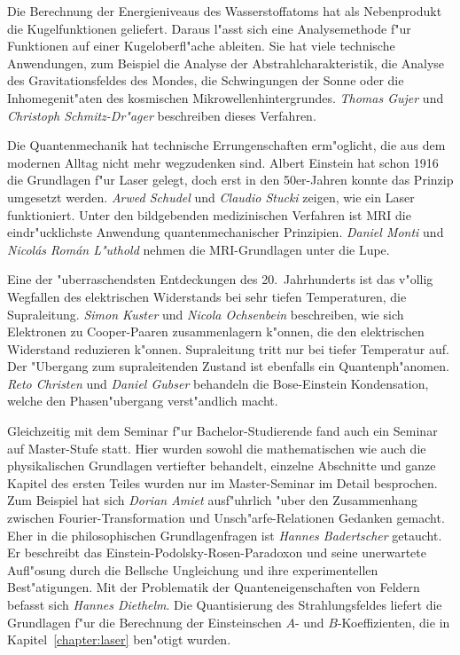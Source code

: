 Die Berechnung der Energieniveaus des Wasserstoffatoms hat als
Nebenprodukt die Kugelfunktionen geliefert.
Daraus l"asst sich eine Analysemethode f"ur Funktionen auf einer
Kugeloberfl"ache ableiten.
Sie hat viele technische Anwendungen, zum Beispiel die Analyse der
Abstrahlcharakteristik, die Analyse des Gravitationsfeldes des
Mondes, die Schwingungen der Sonne oder die Inhomegenit"aten des
kosmischen Mikrowellenhintergrundes.
{\em Thomas Gujer} und {\em Christoph Schmitz-Dr"ager} beschreiben
dieses Verfahren.

Die Quantenmechanik hat technische Errungenschaften erm"oglicht, die
aus dem modernen Alltag nicht mehr wegzudenken sind.
Albert Einstein hat schon 1916 die Grundlagen f"ur Laser gelegt,
doch erst in den 50er-Jahren konnte das Prinzip umgesetzt werden.
{\em Arwed Schudel} und {\em Claudio Stucki} zeigen, wie ein Laser funktioniert.
Unter den bildgebenden medizinischen Verfahren ist MRI die eindr"ucklichste
Anwendung quantenmechanischer Prinzipien.
{\em Daniel Monti} und {\em Nicol\'as Rom\'an L"uthold}
nehmen die MRI-Grundlagen unter die Lupe.

Eine der "uberraschendsten Entdeckungen des 20.~Jahrhunderts ist das
v"ollig Wegfallen des elektrischen Widerstands bei sehr tiefen 
Temperaturen, die Supraleitung.
{\em Simon Kuster} und {\em Nicola Ochsenbein} beschreiben, wie sich
Elektronen zu Cooper-Paaren zusammenlagern k"onnen, die
den elektrischen Widerstand reduzieren k"onnen.
Supraleitung tritt nur bei tiefer Temperatur auf.
Der "Ubergang zum supraleitenden Zustand ist ebenfalls ein Quantenph"anomen.
{\em Reto Christen} und {\em Daniel Gubser} behandeln die Bose-Einstein
Kondensation, welche den Phasen"ubergang verst"andlich macht.

Gleichzeitig mit dem Seminar f"ur Bachelor-Studierende fand auch ein
Seminar auf Master-Stufe statt.
Hier wurden sowohl die mathematischen wie auch die physikalischen Grundlagen
vertiefter behandelt, einzelne Abschnitte und ganze Kapitel des ersten
Teiles wurden nur im Master-Seminar im Detail besprochen.
Zum Beispiel hat sich {\em Dorian Amiet} ausf"uhrlich
"uber den Zusammenhang zwischen Fourier-Transformation und 
Unsch"arfe-Relationen Gedanken gemacht.
Eher in die philosophischen Grundlagenfragen ist {\em Hannes Badertscher}
getaucht. Er beschreibt das Einstein-Podolsky-Rosen-Paradoxon und seine
unerwartete Aufl"osung durch die Bellsche Ungleichung und ihre experimentellen
Best"atigungen.
Mit der Problematik der Quanteneigenschaften von Feldern befasst sich
{\em Hannes Diethelm}. 
Die Quantisierung des Strahlungsfeldes liefert die Grundlagen f"ur die
Berechnung der Einsteinschen $A$- und $B$-Koeffizienten, die in 
Kapitel~\ref{chapter:laser} ben"otigt wurden.

